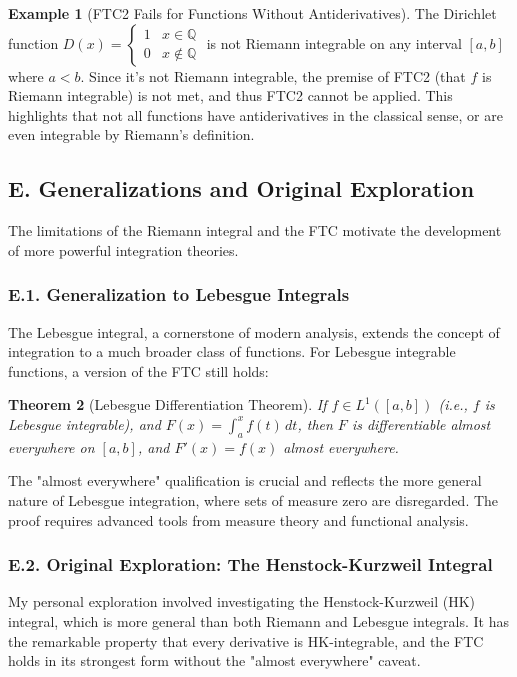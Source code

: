 \documentclass[11pt, a4paper]{article}
\theoremstyle{plain} %
\newtheorem{theorem}{Theorem}[section] %
\theoremstyle{definition} %
\newtheorem{example}[theorem]{Example}
\theoremstyle{remark} %
\begin{document}
\begin{example}[FTC2 Fails for Functions Without Antiderivatives]
    The Dirichlet function \( D(x) = \begin{cases} 1 & x \in \mathbb{Q} \\ 0 & x \notin \mathbb{Q} \end{cases} \) is not Riemann integrable on any interval \( [a,b] \) where \( a < b \). Since it's not Riemann integrable, the premise of FTC2 (that \( f \) is Riemann integrable) is not met, and thus FTC2 cannot be applied. This highlights that not all functions have antiderivatives in the classical sense, or are even integrable by Riemann's definition.
\end{example}

\subsection{E. Generalizations and Original Exploration}

The limitations of the Riemann integral and the FTC motivate the development of more powerful integration theories.

\subsubsection*{E.1. Generalization to Lebesgue Integrals}
The Lebesgue integral, a cornerstone of modern analysis, extends the concept of integration to a much broader class of functions. For Lebesgue integrable functions, a version of the FTC still holds:
\begin{theorem}[Lebesgue Differentiation Theorem]
    If \( f \in L^1([a,b]) \) (i.e., \( f \) is Lebesgue integrable), and \( F(x) = \int_a^x f(t) \, dt \), then \( F \) is differentiable almost everywhere on \( [a,b] \), and \( F'(x) = f(x) \) almost everywhere.
\end{theorem}
The "almost everywhere" qualification is crucial and reflects the more general nature of Lebesgue integration, where sets of measure zero are disregarded. The proof requires advanced tools from measure theory and functional analysis.

\subsubsection*{E.2. Original Exploration: The Henstock-Kurzweil Integral}
My personal exploration involved investigating the Henstock-Kurzweil (HK) integral, which is more general than both Riemann and Lebesgue integrals. It has the remarkable property that every derivative is HK-integrable, and the FTC holds in its strongest form without the "almost everywhere" caveat.
\end{document}
